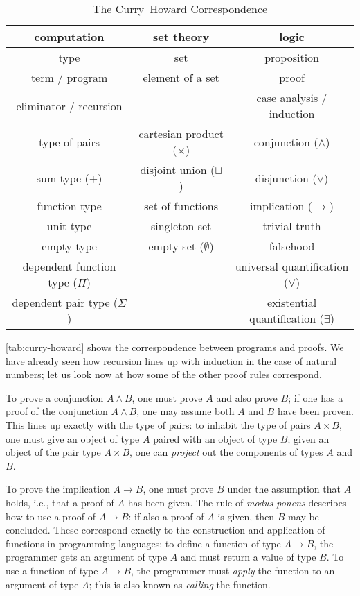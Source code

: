 \begin{table}[t]
\centering
\begin{tabular}{c|c|c}
computation & set theory & logic \\ \hline
type & set & proposition \\
term / program & element of a set & proof \\
eliminator / recursion & & case analysis / induction \\
type of pairs & cartesian product ($\times$) & conjunction ($\wedge$) \\
sum type ($+$) & disjoint union ($\sqcup$) & disjunction ($\vee$) \\
function type & set of functions & implication ($\to$) \\
unit type & singleton set & trivial truth \\
empty type & empty set ($\emptyset$) & falsehood \\
dependent function type ($\Pi$) & & universal quantification ($\forall$) \\
dependent pair type ($\Sigma$) & & existential quantification ($\exists$)
\end{tabular}
\caption{The Curry--Howard Correspondence}
\label{tab:curry-howard}
\end{table}

\autoref{tab:curry-howard} shows the correspondence between programs and proofs.
We have already seen how recursion lines up with induction in the case of natural numbers; let us look now at how some of the other proof rules correspond.

To prove a conjunction $A \wedge B$, one must prove $A$ and also prove $B$; if one has a proof of the conjunction $A \wedge B$, one may assume both $A$ and $B$ have been proven.
This lines up exactly with the type of pairs: to inhabit the type of pairs $A \times B$, one must give an object of type $A$ paired with an object of type $B$; given an object of the pair type $A \times B$, one can \emph{project} out the components of types $A$ and $B$.

To prove the implication $A \to B$, one must prove $B$ under the assumption that $A$ holds, i.e., that a proof of $A$ has been given.
The rule of \emph{modus ponens} describes how to use a proof of $A \to B$: if also a proof of $A$ is given, then $B$ may be concluded.
These correspond exactly to the construction and application of functions in programming languages:
to define a function of type $A \to B$, the programmer gets an argument of type $A$ and must return a value of type $B$.
To use a function of type $A \to B$, the programmer must \emph{apply} the function to an argument of type $A$; this is also known as \emph{calling} the function.

